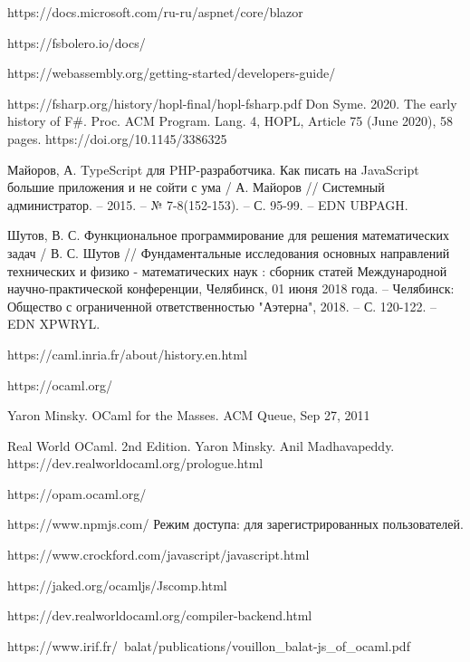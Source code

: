 \begin{thebibliography}{00}
    https://docs.microsoft.com/ru-ru/aspnet/core/blazor \TODO

    https://fsbolero.io/docs/ \TODO

    https://webassembly.org/getting-started/developers-guide/ \TODO

    https://fsharp.org/history/hopl-final/hopl-fsharp.pdf
    Don Syme. 2020. The early history of F\#. Proc. ACM Program. Lang. 4, HOPL, Article 75 (June 2020), 58 pages. https://doi.org/10.1145/3386325
    \TODO

    Майоров, А. TypeScript для PHP-разработчика. Как писать на JavaScript большие приложения и не сойти с ума /
    А. Майоров // Системный администратор. – 2015. – № 7-8(152-153). – С. 95-99. – EDN UBPAGH.

    Шутов, В. С. Функциональное программирование для решения математических задач
    / В. С. Шутов // Фундаментальные исследования основных направлений технических и физико - математических наук
    : сборник статей Международной научно-практической конференции, Челябинск, 01 июня 2018 года.
    – Челябинск: Общество с ограниченной ответственностью "Аэтерна", 2018. – С. 120-122. – EDN XPWRYL.

    https://caml.inria.fr/about/history.en.html \TODO

    https://ocaml.org/ \TODO

    Yaron Minsky. OCaml for the Masses. ACM Queue, Sep 27, 2011 \TODO

    Real World OCaml. 2nd Edition. Yaron Minsky. Anil Madhavapeddy.
    https://dev.realworldocaml.org/prologue.html \TODO

    https://opam.ocaml.org/ \TODO

    https://www.npmjs.com/ \TODO Режим доступа: для зарегистрированных пользователей.

    https://www.crockford.com/javascript/javascript.html

    https://jaked.org/ocamljs/Jscomp.html \TODO

    https://dev.realworldocaml.org/compiler-backend.html \TODO

    https://www.irif.fr/~balat/publications/vouillon\_balat-js\_of\_ocaml.pdf \TODO


\end{thebibliography}
